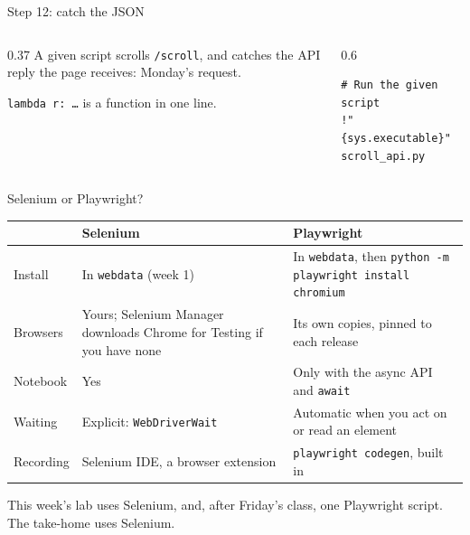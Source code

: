\documentclass[9pt,aspectratio=169]{beamer}
\begin{document}
\begin{frame}[fragile]{Step 12: catch the JSON}
    \begin{columns}[T]
        \begin{column}{0.37\textwidth}
            A given script scrolls \texttt{/scroll}, and catches the API reply the page receives: Monday's request.

            \medskip
            \texttt{lambda r: \ldots} is a function in one line.
        \end{column}
        \begin{column}{0.6\textwidth}
\begin{lstlisting}[style=lab]
# Run the given script
!"{sys.executable}" scroll_api.py
\end{lstlisting}
        \end{column}
    \end{columns}
\end{frame}

\begin{frame}{Selenium or Playwright?}
    \centering\small
    \begin{tabular}{p{}p{}p{}}
        & \textbf{Selenium} & \textbf{Playwright} \tabularnewline \hline
        \raggedright Install & \raggedright In \texttt{webdata} (week 1) & \raggedright In \texttt{webdata}, then \texttt{python -m playwright install chromium} \tabularnewline[0.5em]
        \raggedright Browsers & \raggedright Yours; Selenium Manager downloads Chrome for Testing if you have none & \raggedright Its own copies, pinned to each release \tabularnewline[0.5em]
        \raggedright Notebook & \raggedright Yes & \raggedright Only with the async API and \texttt{await} \tabularnewline[0.5em]
        \raggedright Waiting & \raggedright Explicit: \texttt{WebDriverWait} & \raggedright Automatic when you act on or read an element \tabularnewline[0.5em]
        \raggedright Recording & \raggedright Selenium IDE, a browser extension & \raggedright \texttt{playwright codegen}, built in \tabularnewline
    \end{tabular}

    \bigskip
    This week's lab uses Selenium, and, after Friday's class, one Playwright script. The take-home uses Selenium.
\end{frame}
\end{document}

